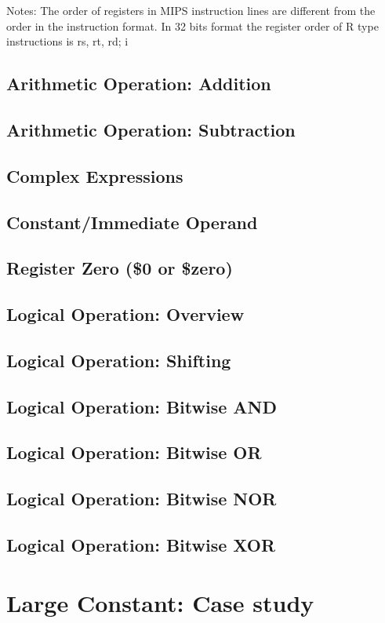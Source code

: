 \documentclass[12pt]{article}
\theoremstyle{definition}
\begin{document}
Notes: The order of registers in MIPS instruction lines are different from the order in the instruction format. \newline
In 32 bits format the register order of R type instructions is rs, rt, rd; i
\subsection{Arithmetic Operation: Addition}
\subsection{Arithmetic Operation: Subtraction}
\subsection{Complex Expressions}
\subsection{Constant/Immediate Operand}
\subsection{Register Zero (\$0 or \$zero)}
\subsection{Logical Operation: Overview}
\subsection{Logical Operation: Shifting}
\subsection{Logical Operation: Bitwise AND}
\subsection{Logical Operation: Bitwise OR} 
\subsection{Logical Operation: Bitwise NOR}
\subsection{Logical Operation: Bitwise XOR}
\section{Large Constant: Case study}
\end{document}
